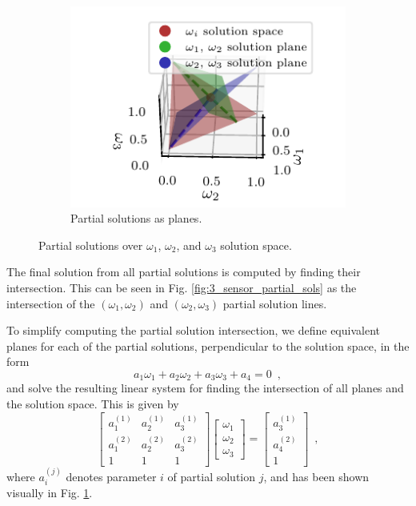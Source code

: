 \documentclass[letterpaper, 10 pt, journal, twoside]{ieeetran}  %
\begin{document}
\begin{figure}[tb]
\begin{subfigure}[t]{0.3\textwidth}
      \begin{center}
         \includegraphics{images/partial_sol_planes.pdf}
      \end{center}
      \vspace{-10pt}
      \caption{Partial solutions as planes.}
      \label{fig:3sen_planes}
   \end{subfigure}
   \caption{Partial solutions over $\omega_1$, $\omega_2$, and $\omega_3$ solution space.}
   \vspace{-\baselineskip}
   \label{fig:partial_sols_and_planes}
\end{figure}
The final solution from all partial solutions is computed by finding their intersection. This can be seen in Fig. \ref{fig:3_sensor_partial_sols} as the intersection of the $(\omega_1,\omega_2)$ and $(\omega_2,\omega_3)$ partial solution lines.

To simplify computing the partial solution intersection, we define equivalent planes for each of the partial solutions, perpendicular to the solution space, in the form
\begin{equation}
   a_1\omega_1 + a_2\omega_2 +a_3\omega_3 + a_4 = 0\enspace, \label{eqn:3sen_plane_eq}
\end{equation}
and solve the resulting linear system for finding the intersection of all planes and the solution space. This is given by
\begin{equation}
   \begin{bmatrix}
      a_1^{(1)} & a_2^{(1)} & a_3^{(1)} \\
      a_1^{(2)} & a_2^{(2)} & a_3^{(2)} \\
      1 & 1 & 1
   \end{bmatrix}
   \begin{bmatrix}
      \omega_1 \\
      \omega_2 \\
      \omega_3
   \end{bmatrix}
   =
   \begin{bmatrix}
      a_3^{(1)} \\
      a_4^{(2)} \\
      1
   \end{bmatrix}\enspace, \label{eqn:3sen_plane_sol_eq}
\end{equation}
where $a_i^{(j)}$ denotes parameter $i$ of partial solution $j$, and has been shown visually in Fig. \ref{fig:3sen_planes}.
\end{document}
